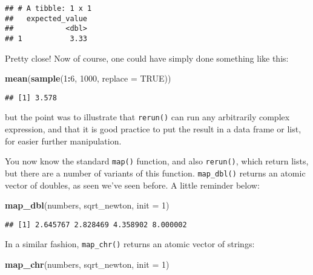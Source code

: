 \documentclass[
]{article}
\newenvironment{Shaded}{\begin{snugshade}}{\end{snugshade}}
\newcommand{\DataTypeTok}[1]{\textcolor[rgb]{0.13,0.29,0.53}{#1}}
\newcommand{\DecValTok}[1]{\textcolor[rgb]{0.00,0.00,0.81}{#1}}
\newcommand{\KeywordTok}[1]{\textcolor[rgb]{0.13,0.29,0.53}{\textbf{#1}}}
\newcommand{\NormalTok}[1]{#1}
\newcommand{\OperatorTok}[1]{\textcolor[rgb]{0.81,0.36,0.00}{\textbf{#1}}}
\newcommand{\OtherTok}[1]{\textcolor[rgb]{0.56,0.35,0.01}{#1}}
\begin{document}
\begin{verbatim}
## # A tibble: 1 x 1
##   expected_value
##            <dbl>
## 1           3.33
\end{verbatim}

Pretty close! Now of course, one could have simply done something like this:

\begin{Shaded}
\begin{Highlighting}[]
\KeywordTok{mean}\NormalTok{(}\KeywordTok{sample}\NormalTok{(}\DecValTok{1}\OperatorTok{:}\DecValTok{6}\NormalTok{, }\DecValTok{1000}\NormalTok{, }\DataTypeTok{replace =} \OtherTok{TRUE}\NormalTok{))}
\end{Highlighting}
\end{Shaded}

\begin{verbatim}
## [1] 3.578
\end{verbatim}

but the point was to illustrate that \texttt{rerun()} can run any arbitrarily complex expression, and that it is good
practice to put the result in a data frame or list, for easier further manipulation.

You now know the standard \texttt{map()} function, and also \texttt{rerun()}, which return lists, but there are a
number of variants of this function. \texttt{map\_dbl()} returns an atomic vector of doubles, as seen
we've seen before. A little reminder below:

\begin{Shaded}
\begin{Highlighting}[]
\KeywordTok{map\_dbl}\NormalTok{(numbers, sqrt\_newton, }\DataTypeTok{init =} \DecValTok{1}\NormalTok{)}
\end{Highlighting}
\end{Shaded}

\begin{verbatim}
## [1] 2.645767 2.828469 4.358902 8.000002
\end{verbatim}

In a similar fashion, \texttt{map\_chr()} returns an atomic vector of strings:

\begin{Shaded}
\begin{Highlighting}[]
\KeywordTok{map\_chr}\NormalTok{(numbers, sqrt\_newton, }\DataTypeTok{init =} \DecValTok{1}\NormalTok{)}
\end{Highlighting}
\end{Shaded}
\end{document}
